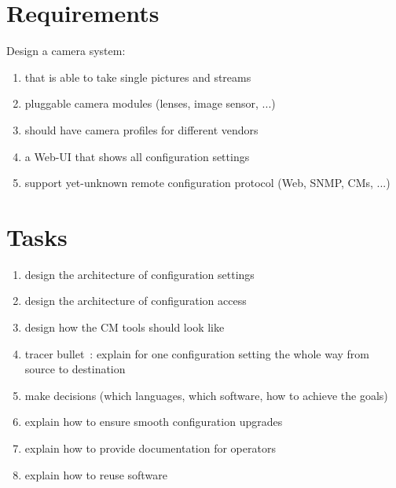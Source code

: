\section{Requirements}

Design a camera system:

\begin{enumerate}
	\item that is able to take single pictures and streams
	\item pluggable camera modules (lenses, image sensor, ...)
	\item should have camera profiles for different vendors
	\item a Web-UI that shows all configuration settings
	\item support yet-unknown remote configuration protocol (Web, SNMP, CMs, ...)
\end{enumerate}

\section{Tasks}

\begin{enumerate}
	\item design the architecture of configuration settings
	\item design the architecture of configuration access
	\item design how the CM tools should look like
	\item tracer bullet~\cite{hunt1999pragmatic}: explain for one configuration setting the whole way from source to destination
	\item make decisions (which languages, which software, how to achieve the goals)
	\item explain how to ensure smooth configuration upgrades
	\item explain how to provide documentation for operators
	\item explain how to reuse software
\end{enumerate}



\begingroup
\sloppy
\makeatletter
\g@addto@macro{\UrlBreaks}{\UrlOrds}
\makeatother

\endgroup







